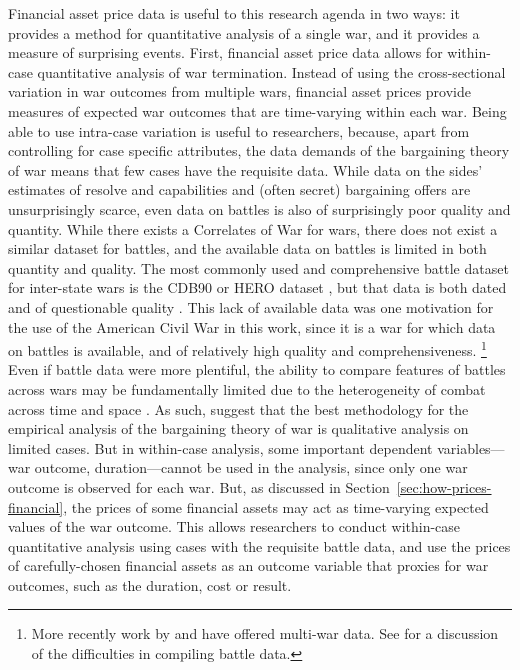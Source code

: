 Financial asset price data is useful to this research agenda in two ways: it provides a method for quantitative analysis of a single war, and it provides a measure of surprising events.
First, financial asset price data allows for within-case quantitative analysis of war termination.
Instead of using the cross-sectional variation in war outcomes from multiple wars, financial asset prices provide measures of expected war outcomes that are time-varying within each war.
Being able to use intra-case variation is useful to researchers, because, apart from controlling for case specific attributes, the data demands of the bargaining theory of war means that few cases have the requisite data.
While data on the sides' estimates of resolve and capabilities and (often secret) bargaining offers are unsurprisingly scarce, even data on battles is also of surprisingly poor quality and quantity.
While there exists a Correlates of War for wars, there does not exist a similar dataset for battles, and the available data on battles is limited in both quantity and quality.
The most commonly used and comprehensive battle dataset for inter-state wars is the CDB90 or HERO dataset \parencites{HistoricalResearchEtAl1984}{cdb90}, but that data is both dated and of questionable quality \parencites[32]{Reiter2003}{BiddleLong2004}.
This lack of available data was one motivation for the use of the American Civil War in this work, since it is a war for which data on battles is available, and of relatively high quality and comprehensiveness.%
\footnote{
More recently work by \textcite{Weisiger2015} and \textcite{CochranLong2014} have offered multi-war data.
See \textcites{cdb90}{Helmbold1995} for a discussion of the difficulties in compiling battle data.
}
Even if battle data were more plentiful, the ability to compare features of battles across wars may be fundamentally limited due to the heterogeneity of combat across time and space \parencite{Reiter2009}.
As such, \textcites{Reiter2003}{Reiter2009} suggest that the best methodology for the empirical analysis of the bargaining theory of war is qualitative analysis on limited cases.
But in within-case analysis, some important dependent variables---war outcome, \eg{}duration---cannot be used in the analysis, since only one war outcome is observed for each war.
But, as discussed in Section~\ref{sec:how-prices-financial}, the prices of some financial assets may act as time-varying expected values of the war outcome.
This allows researchers to conduct within-case quantitative analysis using cases with the requisite battle data, and use the prices of carefully-chosen financial assets as an outcome variable that proxies for war outcomes, such as the duration, cost or result.


